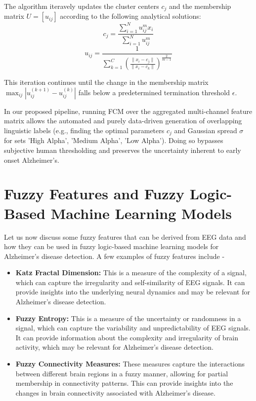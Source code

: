 \documentclass[openany]{book}
\begin{document}
The algorithm iteravely updates the cluster centers $c_j$ and the membership matrix $U = [u_{ij}]$ according to the following analytical solutions:
\begin{equation}
    c_j = \frac{\sum_{i=1}^N u_{ij}^m x_i}{\sum_{i=1}^N u_{ij}^m}
\end{equation}
\begin{equation}
    u_{ij} = \frac{1}{\sum_{k=1}^C \left( \frac{\| x_i - c_j \|}{\| x_i - c_k \|} \right)^{\frac{2}{m-1}}}
\end{equation}

This iteration continues until the change in the membership matrix $\max_{ij} {|u_{ij}^{(k+1)} - u_{ij}^{(k)}|}$ falls below a predetermined termination threshold $\epsilon$.

In our proposed pipeline, running FCM over the aggregated multi-channel feature matrix allows the automated and purely data-driven generation of overlapping linguistic labels (e.g., finding the optimal parameters $c_j$ and Gaussian spread $\sigma$ for sets 'High Alpha', 'Medium Alpha', 'Low Alpha'). Doing so bypasses subjective human thresholding and preserves the uncertainty inherent to early onset Alzheimer's.

\section{Fuzzy Features and Fuzzy Logic-Based Machine Learning Models}
\label{sec:fuzzy_ml}
Let us now discuss some fuzzy features that can be derived from EEG data and how they can be used in fuzzy logic-based machine learning models for Alzheimer's disease detection. A few examples of fuzzy features include -
\begin{itemize}
    \item \textbf{Katz Fractal Dimension:} This is a measure of the complexity of a signal, which can capture the irregularity and self-similarity of EEG signals. It can provide insights into the underlying neural dynamics and may be relevant for Alzheimer's disease detection.
    \item \textbf{Fuzzy Entropy:} This is a measure of the uncertainty or randomness in a signal, which can capture the variability and unpredictability of EEG signals. It can provide information about the complexity and irregularity of brain activity, which may be relevant for Alzheimer's disease detection.
    \item \textbf{Fuzzy Connectivity Measures:} These measures capture the interactions between different brain regions in a fuzzy manner, allowing for partial membership in connectivity patterns. This can provide insights into the changes in brain connectivity associated with Alzheimer's disease.
\end{itemize}
\end{document}
